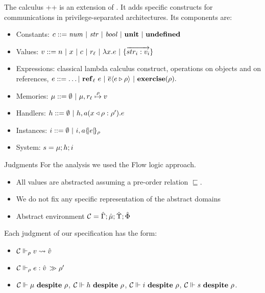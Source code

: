 \documentclass[11pt]{beamer}
\begin{document}
\begin{frame}{The calculus}
\ljs++ is an extension of \ljs. It adds specific constructs for communications in privilege-separated architectures. Its components are:

\begin{itemize}
\item Constants: $c ::= \mathit{num} ~|~ \mathit{str} ~|~ \mathit{bool} ~|~ \unit ~|~ \undef$
\item Values: $v ::= n ~|~ x ~|~ c ~|~ r_{\ell} ~|~ \lam{x}{e} ~|~ \rec{\vec{str_i:v_i}}$
\item Expressions: classical lambda calculus construct, operations on objects and on references, $e ::= \dots |~ \newref{\ell}{e} ~|~ \send{e}{e}{\rho} ~|~ \exercise{\rho}.$
\item Memories: $\mu ::= \emptyset ~|~ \mu, \map{r_{\ell}}{\rho}{v}$
\item Handlers: $h ::= \emptyset ~|~ h,\handler{a}{x}{\rho}{e}{\rho'}$
\item Instances: $i ::= \emptyset ~|~ i,\inst{a}{e}{\rho}$
\item System: $s = \sys{\mu}{h}{i}$
\end{itemize}
\end{frame}

\begin{frame}{Judgments}
For the analysis we used the Flow logic \cite{FlowLogic} approach.
\begin{itemize}
\item All values are abstracted assuming a pre-order relation $\sqsubseteq$.
\item We do not fix any specific representation of the abstract domains
\item Abstract environment $\absC=\absenv ; \absmem ; \abstack ; \absnet$
\end{itemize}
Each judgment of our specification has the form: 
\begin{itemize}
\item $\absC \Vdash_\rho v \rightsquigarrow \hat{v}$
\item $\absC  \Vdash_\rho e: \hat{v} \escalate{\rho'}$
\item $\absC \Vdash \mu \despite{\rho}$, $\absC \Vdash h \despite{\rho}$, 
$\absC \Vdash i \despite{\rho}$, $\absC \Vdash s \despite{\rho}$.
\end{itemize}
\end{frame}
\end{document}

